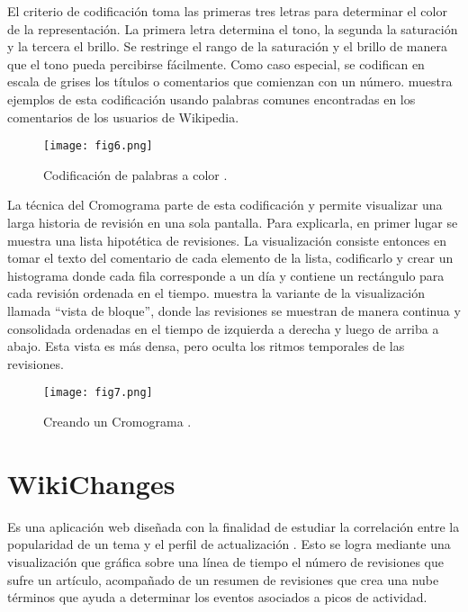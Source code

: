 El criterio de codificación toma las primeras tres letras para determinar el color de la representación. La primera letra determina el tono, la segunda la saturación y la tercera el brillo. Se restringe el rango de la saturación y el brillo de manera que el tono pueda percibirse fácilmente. Como caso especial, se codifican en escala de grises los títulos o comentarios que comienzan con un número.  muestra ejemplos de esta codificación usando palabras comunes encontradas en los comentarios de los usuarios de Wikipedia.

\begin{figure}[htp]
  \centering
  \texttt{[image: fig6.png]}
  \caption[Codificación de palabras a color]{Codificación de palabras a color \cite[Fig. 1]{Wat07}.}
  \label{fig:fig6}
\end{figure}

La técnica del Cromograma parte de esta codificación y permite visualizar una larga historia de revisión en una sola pantalla. Para explicarla, en primer lugar se muestra  una lista hipotética de revisiones. La visualización consiste entonces en tomar el texto del comentario de cada elemento de la lista, codificarlo y crear un histograma  donde cada fila corresponde a un día y contiene un rectángulo para cada revisión ordenada en el tiempo.  muestra la variante de la visualización llamada “vista de bloque”, donde las revisiones se muestran de manera continua y consolidada ordenadas en el tiempo de izquierda a derecha y luego de arriba a abajo. Esta vista es más densa, pero oculta los ritmos temporales de las revisiones.

\begin{figure}[htp]
  \centering
  \texttt{[image: fig7.png]}
  \caption[Creando un Cronograma]{Creando un Cromograma \cite[Fig. 2]{Wat07}.}
  \label{fig:fig7}
\end{figure}

\section{WikiChanges}
Es una aplicación web diseñada con la finalidad de estudiar la correlación entre la popularidad de un tema y el perfil de actualización \cite{Nun08}. Esto se logra mediante una visualización que gráfica sobre una línea de tiempo el número de revisiones que sufre un artículo, acompañado de un resumen de revisiones que crea una nube términos que ayuda a determinar los eventos asociados a picos de actividad.


